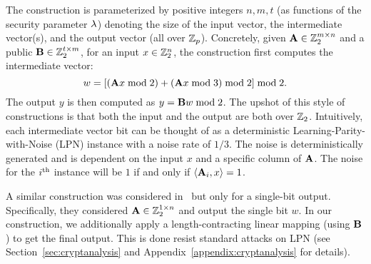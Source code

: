 \begin{itemize}
    \hspace*{1em} The construction is parameterized by positive integers $n,m,t$ (as functions of the security parameter $\lambda$) denoting the size of the input vector, the intermediate vector(s), and the output vector (all over $\mathbb{Z}_p$).
    Concretely, given $\mat{A} \in \Z_2^{m \times n}$ and a public $\mat{B} \in \Z_2^{t \times m}$, for an input $x \in \mathbb{Z}_2^n$, the construction first computes the intermediate vector:
    \[
        w = \left[(\mat{A}x \bmod 2) + (\mat{A}x \bmod 3) \bmod 2\right] \bmod 2.
    \]
    The output $y$ is then computed as $y = \mat{B}w \bmod 2$. The upshot of this style of constructions is that both the input and the output are both over $\mathbb{Z}_2$. Intuitively, each intermediate vector bit can be thought of as a deterministic Learning-Parity-with-Noise (LPN) instance with a noise rate of $1/3$. The noise is deterministically generated and is dependent on the input $x$ and a specific column of $\mat{A}$. The noise for the $i^{\textnormal{th}}$ instance will be $1$ if and only if $\left<\mat{A}_i, x\right> = 1$.

    \hspace*{1em} A similar construction was considered in~\cite{boneh2018-darkmatter} but only for a single-bit output. Specifically, they considered $\mat{A} \in \Z_2^{1 \times n}$ and output the single bit $w$. In our construction, we additionally apply a length-contracting linear mapping (using $\mat{B}$) to get the final output. This is done resist standard attacks on LPN (see Section~\ref{sec:cryptanalysis} and Appendix~\ref{appendix:cryptanalysis} for details).
\end{itemize}


